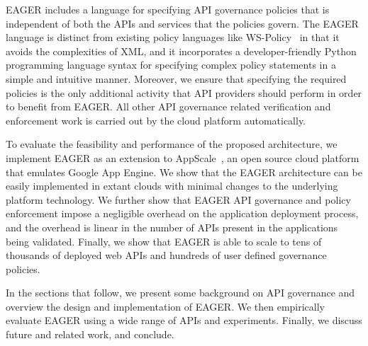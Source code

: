 EAGER includes a language for specifying 
API governance policies that is independent of both the APIs and services that
the policies govern.  The EAGER language is distinct from 
existing policy languages like WS-Policy~\cite{WSPolicy,soagovstandard}
in that it avoids the complexities of XML, 
and it incorporates a developer-friendly Python programming language syntax for 
specifying complex policy statements in a simple and 
intuitive manner. Moreover, we ensure that specifying the required policies 
is the only additional activity that API providers should perform in
order to benefit from EAGER. All other API governance related verification and 
enforcement work is carried out by the cloud platform automatically.

To evaluate the feasibility and performance of the proposed 
architecture, we implement EAGER as an extension to AppScale~\cite{appscale13}, 
an open source
cloud platform that emulates Google App Engine. We show that the EAGER 
architecture can be easily implemented in extant clouds with
minimal changes to the underlying platform technology. We further show that 
EAGER API governance and policy enforcement impose a negligible 
overhead on the application deployment process, and the overhead
is linear in the number of APIs present in the applications being validated.  
Finally, we show that EAGER is able to
scale to tens of thousands of deployed web APIs and hundreds of user 
defined governance policies.

In the sections that follow, we present some background on API governance
and overview the design and implementation of
EAGER. We then empirically evaluate EAGER using a wide range of APIs and
experiments.  Finally, we discuss future and related work, and conclude.
